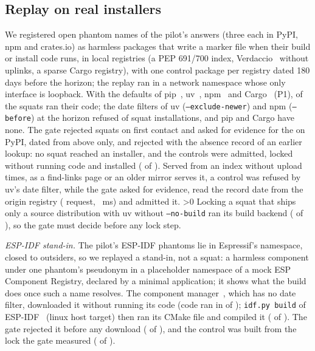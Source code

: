 \documentclass[conference]{IEEEtran}
\begin{document}
\subsection{Replay on real installers}
\label{sec:replay}
We registered \rRpSquatsBaseN{} open phantom names of the pilot's answers (three each in PyPI, npm and crates.io) as
harmless packages that write a marker file when their build or install code runs, in local registries (a PEP 691/700
index, Verdaccio~\rRpVerdaccio{} without uplinks, a sparse Cargo registry), with one control package per registry
dated 180 days before the horizon\ifnum{}; the replay ran in a network namespace whose only interface is
loopback\fi. With the defaults of pip~\rRpPip, uv~\rRpUv, npm~\rRpNpm{} and Cargo~\rRpCargo{} (P1),
\rRpPOneExec{} of the \rRpSquatsBaseN{} squats ran their code; the date filters of uv (\texttt{--exclude-newer}) and
npm (\texttt{--before}) at the horizon refused \rRpPThreeBlocked{} of \rRpPThreeRuns{} squat installations, and pip
and Cargo have none. The gate rejected \rRpSciiRejectBase{} squats on first contact and asked for evidence for the
\rRpSciiRequest{} on PyPI, dated from above only, and rejected \rRpSciiAbsRejectBase{} with the absence record of an
earlier lookup: no squat reached an installer, and the controls were admitted, locked without running code and
installed (\rRpCtrlAdmitBase{} of \rRpCtrlBaseN). Served from an index without upload times, as a find-links page or an
older mirror serves it, a control was refused by uv's date filter, while the gate asked for evidence, read the record
date from the origin registry (\rRpDlHttp{} request, \rRpDlMs~ms) and admitted it.
\ifnum\rRpLockExec>0 Locking a squat that ships only a source distribution with uv without \texttt{--no-build} ran its
build backend (\rRpLockExec{} of \rRpLockExecN), so the gate must decide before any lock step.\fi

\ifnum{}
\emph{ESP-IDF stand-in.} The pilot's ESP-IDF phantoms lie in Espressif's namespace, closed to outsiders, so we
replayed a stand-in, not a squat: a harmless component under one phantom's pseudonym in a placeholder namespace of a
mock ESP Component Registry, declared by a minimal application; it shows what the build does once such a name
resolves. The component manager~\rRpIdfCm, which has no date filter, downloaded it without running its code (code ran
in \rRpEspDlExec{} of \rRpEspN); \texttt{idf.py build} of ESP-IDF~\rRpIdf{} (linux host target) then ran its CMake file
and compiled it (\rRpEspBuildExec{} of \rRpEspN). The gate rejected it before any download (\rRpEspGateReject{} of
\rRpEspN), and the control was built from the lock the gate measured (\rRpEspCtrlBuilt{} of \rRpEspCtrlN).
\fi
\fi
\end{document}
